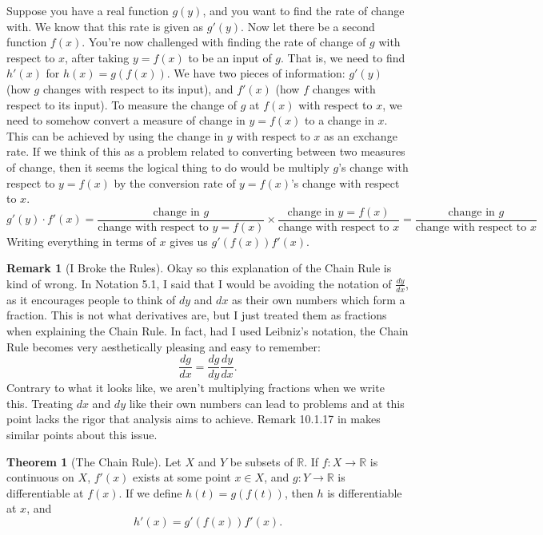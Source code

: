 \documentclass{article}
\newcommand{\R}{\mathbb{R}}
\theoremstyle{definition}
\newtheorem{theorem}{Theorem}[section]
\newtheorem{remark}{Remark}[section]
\begin{document}
	Suppose you have a real function $ g(y) $, and you want to find the rate of change with. We know that this rate is given as $ g'(y) $. Now let there be a second function $ f(x) $. You're now challenged with finding the rate of change of $ g $ with respect to $ x $, after taking $ y=f(x) $ to be an input of $ g $. That is, we need to find $ h'(x) $ for $ h(x)=g(f(x)) $. We have two pieces of information:  $ g'(y) $ (how $ g $ changes with respect to its input), and $ f'(x) $ (how $ f $ changes with respect to its input). To measure the change of $ g $ at $ f(x) $ with respect to $ x $, we need to somehow convert a measure of change in $ y=f(x) $ to a change in $ x $. This can be achieved by using the change in $ y $ with respect to $ x $ as an exchange rate. If we think of this as a problem related to converting between two measures of change, then it seems the logical thing to do would be multiply $ g $'s change with respect to $ y=f(x) $ by the conversion rate of $ y=f(x) $'s change with respect to $ x $. 
	$$g'(y)\cdot f'(x)=\frac{\text{change in }g}{{\text{change with respect to }y=f(x)}}\times \frac{\text{change in }y=f(x)}{\text{change with respect to }x}=\frac{\text{change in }g}{\text{change with respect to }x} $$ Writing everything in terms of $ x $ gives us $ g'(f(x))f'(x)$.
	\begin{remark}[I Broke the Rules]
		Okay so this explanation of the Chain Rule is kind of wrong. In Notation 5.1, I said that I would be avoiding the notation of $ \frac{dy}{dx} $, as it encourages people to think of $ dy $ and $ dx $ as their own numbers which form a fraction. This is not what derivatives are, but I just treated them as fractions when explaining the Chain Rule. In fact, had I used Leibniz's notation, the Chain Rule becomes very aesthetically pleasing and easy to remember: $$ \frac{dg}{dx}=\frac{dg}{dy}\frac{dy}{dx} .$$ Contrary to what it looks like, we aren't multiplying fractions when we write this. Treating $ dx $ and $ dy $ like their own numbers can lead to problems and at this point lacks the rigor that analysis aims to achieve. Remark 10.1.17 in \cite{tao2006analysis} makes similar points about this issue. 
	\end{remark}
	\begin{theorem}[The Chain Rule]
		Let $ X $ and $ Y $ be subsets of $ \R $. If $ f:X\to\R $ is continuous on $ X $, $ f'(x) $ exists at some point $ x\in X $, and $ g:Y\to \R $ is differentiable at $ f(x) $. If we define $h(t)=g(f(t)) $, then $ h $ is differentiable at $ x $, and $$ h'(x)=g'(f(x))f'(x).$$
	\end{theorem}
\end{document}
